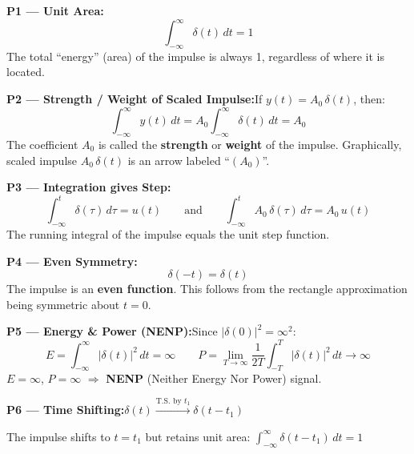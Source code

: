 \documentclass[10pt,a4paper]{article}
\begin{document}
\begin{propbox}
\textbf{P1 --- Unit Area:}
\[
\int_{-\infty}^{\infty}\delta(t)\,dt = 1
\]
The total ``energy'' (area) of the impulse is always 1, regardless of where it is located.

\smallskip
\textbf{P2 --- Strength / Weight of Scaled Impulse:}\quad If $y(t) = A_0\,\delta(t)$, then:
\[
\int_{-\infty}^{\infty} y(t)\,dt = A_0\int_{-\infty}^{\infty}\delta(t)\,dt = A_0
\]
The coefficient $A_0$ is called the \textbf{strength} or \textbf{weight} of the impulse. Graphically, scaled impulse $A_0\,\delta(t)$ is an arrow labeled ``$(A_0)$''.

\smallskip
\textbf{P3 --- Integration gives Step:}
\[
\int_{-\infty}^{t}\delta(\tau)\,d\tau = u(t)
\qquad\text{and}\qquad
\int_{-\infty}^{t} A_0\,\delta(\tau)\,d\tau = A_0\,u(t)
\]
The running integral of the impulse equals the unit step function.

\smallskip
\textbf{P4 --- Even Symmetry:}
\[
\delta(-t) = \delta(t)
\]
The impulse is an \textbf{even function}. This follows from the rectangle approximation being symmetric about $t=0$.

\smallskip
\textbf{P5 --- Energy \& Power (NENP):}\quad Since $|\delta(0)|^2 = \infty^2$:
\[
E = \int_{-\infty}^{\infty}|\delta(t)|^2\,dt = \infty \qquad P = \lim_{T\to\infty}\frac{1}{2T}\int_{-T}^{T}|\delta(t)|^2\,dt \to \infty
\]
$E = \infty$, $P = \infty$ $\Rightarrow$ \textbf{NENP} (Neither Energy Nor Power) signal.

\smallskip
\textbf{P6 --- Time Shifting:}\quad $\delta(t) \xrightarrow{\text{T.S. by }t_1} \delta(t-t_1)$

The impulse shifts to $t = t_1$ but retains unit area:
$\displaystyle\int_{-\infty}^{\infty}\delta(t-t_1)\,dt = 1$

\begin{center}
\end{center}


\end{propbox}
\end{document}
